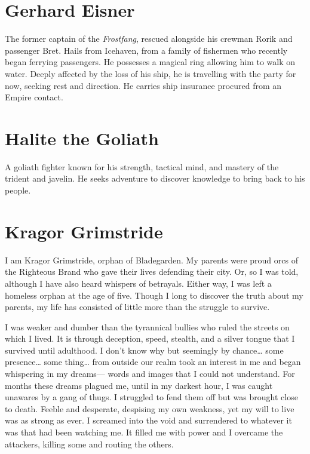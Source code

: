 \documentclass[
  letterpaper,12pt,twoside,twocolumn,openany,
  nodeprecatedcode,bg=full]{dndbook}
\begin{document}
\chapter{Gerhard Eisner}\label{gerhard-eisner}

The former captain of the \emph{Frostfang}, rescued alongside his
crewman Rorik and passenger Bret. Hails from Icehaven, from a family of
fishermen who recently began ferrying passengers. He possesses a magical
ring allowing him to walk on water. Deeply affected by the loss of his
ship, he is travelling with the party for now, seeking rest and
direction. He carries ship insurance procured from an Empire contact.

\chapter{Halite the Goliath}\label{halite-the-goliath}

A goliath fighter known for his strength, tactical mind, and mastery of
the trident and javelin. He seeks adventure to discover knowledge to
bring back to his people.

\chapter{Kragor Grimstride}\label{kragor-grimstride}

I am Kragor Grimstride, orphan of Bladegarden. My parents were proud
orcs of the Righteous Brand who gave their lives defending their city.
Or, so I was told, although I have also heard whispers of betrayals.
Either way, I was left a homeless orphan at the age of five. Though I
long to discover the truth about my parents, my life has consisted of
little more than the struggle to survive.

I was weaker and dumber than the tyrannical bullies who ruled the
streets on which I lived. It is through deception, speed, stealth, and a
silver tongue that I survived until adulthood. I don't know why but
seemingly by chance\ldots{} some presence\ldots{} some thing\ldots{}
from outside our realm took an interest in me and began whispering in my
dreams--- words and images that I could not understand. For months these
dreams plagued me, until in my darkest hour, I was caught unawares by a
gang of thugs. I struggled to fend them off but was brought close to
death. Feeble and desperate, despising my own weakness, yet my will to
live was as strong as ever. I screamed into the void and surrendered to
whatever it was that had been watching me. It filled me with power and I
overcame the attackers, killing some and routing the others.
\end{document}
